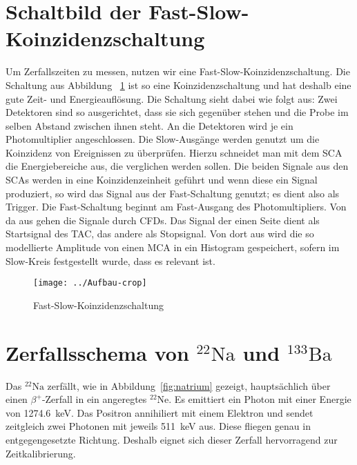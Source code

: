 \documentclass[11pt, ngerman, fleqn, DIV=15, headinclude, BCOR=2cm]{scrreprt}
\begin{document}
\section{Schaltbild der Fast-Slow-Koinzidenzschaltung}

Um Zerfallszeiten zu messen, nutzen wir eine Fast-Slow-Koinzidenzschaltung.
Die Schaltung aus Abbildung ~\ref{fig:aufbau} ist so eine
Koinzidenzschaltung und hat deshalb eine gute Zeit- und Energieauflösung. 
Die Schaltung sieht dabei wie folgt aus: 
Zwei Detektoren sind so ausgerichtet, dass sie sich gegenüber stehen und die
Probe im selben Abstand zwischen ihnen steht. An die Detektoren wird je ein
Photomultiplier angeschlossen. Die Slow-Ausgänge werden genutzt um die
Koinzidenz von Ereignissen zu überprüfen. Hierzu schneidet man mit dem SCA die
Energiebereiche aus, die verglichen werden sollen. Die beiden Signale aus den
SCAs werden in eine Koinzidenzeinheit geführt und wenn diese ein Signal
produziert, so wird das Signal aus der Fast-Schaltung genutzt; es dient also
als Trigger. Die Fast-Schaltung beginnt am Fast-Ausgang des Photomultipliers.
Von da aus gehen die Signale durch CFDs. Das Signal der einen Seite dient als
Startsignal des TAC, das andere als Stopsignal. Von dort aus wird die so
modellierte Amplitude von einen MCA in ein Histogram gespeichert, sofern im
Slow-Kreis festgestellt wurde, dass es relevant ist.


\begin{figure}[htbp]
    \centering
    \texttt{[image: ../Aufbau-crop]}
    \caption{%
        Fast-Slow-Koinzidenzschaltung
    }
    \label{fig:aufbau}
\end{figure}

\section{Zerfallsschema von $^{22}\text{Na}$ und $^{133}\text{Ba}$}

Das $^{22}\text{Na}$ zerfällt, wie in Abbildung~\ref{fig:natrium} gezeigt, hauptsächlich über einen $\beta^+$-Zerfall in ein
angeregtes $^{22}\text{Ne}$. Es emittiert ein Photon mit einer Energie von
\SI{1274,6}{\kilo\electronvolt}. Das Positron annihiliert mit einem
Elektron und sendet zeitgleich zwei Photonen mit jeweils \SI{511}{\kilo\electronvolt}
aus. Diese fliegen genau in entgegengesetzte Richtung. Deshalb eignet
sich dieser Zerfall hervorragend zur Zeitkalibrierung. 
\end{document}
